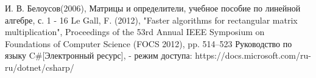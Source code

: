 \documentclass[12pt]{report}
\begin{document}
 \begin{thebibliography}{3}
И. В. Белоусов(2006), Матрицы и определители, учебное пособие по линейной алгебре, с. 1 - 16
Le Gall, F. (2012), "Faster algorithms for rectangular matrix multiplication", Proceedings of the 53rd Annual IEEE Symposium on Foundations of Computer Science (FOCS 2012), pp. 514–523
Руководство по языку C\#[Электронный ресурс], - режим доступа: https://docs.microsoft.com/ru-ru/dotnet/csharp/
\end{thebibliography}
\end{document}
